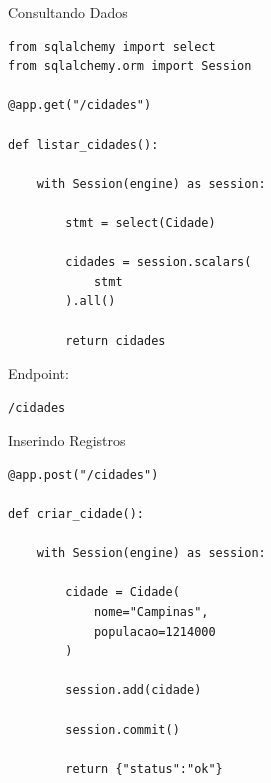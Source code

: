 \documentclass{beamer}
\begin{document}
\begin{frame}[fragile]{Consultando Dados}

\begin{verbatim}
from sqlalchemy import select
from sqlalchemy.orm import Session

@app.get("/cidades")

def listar_cidades():

    with Session(engine) as session:

        stmt = select(Cidade)

        cidades = session.scalars(
            stmt
        ).all()

        return cidades
\end{verbatim}

\vspace{0.2cm}

Endpoint:

\begin{verbatim}
/cidades
\end{verbatim}

\end{frame}

\begin{frame}[fragile]{Inserindo Registros}

\begin{verbatim}
@app.post("/cidades")

def criar_cidade():

    with Session(engine) as session:

        cidade = Cidade(
            nome="Campinas",
            populacao=1214000
        )

        session.add(cidade)

        session.commit()

        return {"status":"ok"}
\end{verbatim}

\end{frame}
\end{document}
